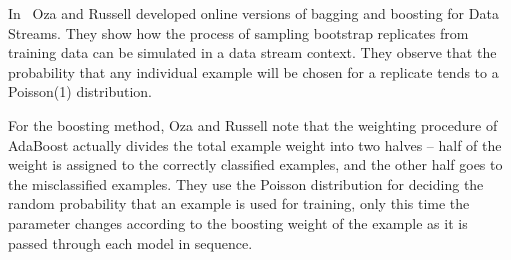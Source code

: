\BEGINOMIT
In~\cite{oza01online} Oza and Russell developed online versions %
of bagging and boosting for Data Streams. They show how the process
of sampling bootstrap replicates from training data can be simulated in a 
data stream context. 
They observe that the probability that any individual
example will be chosen for a replicate %
tends to a Poisson(1) distribution. 

For the boosting method, Oza and Russell 
note that the weighting procedure of AdaBoost actually divides the total example 
weight into two halves \--- half of the weight is assigned to the correctly
classified examples, and the other half goes to the misclassified examples. %
They use the Poisson distribution for 
deciding the random probability that an example is used for training, only this time
the parameter changes according to the boosting weight of the example
as it is passed through each model in sequence.

